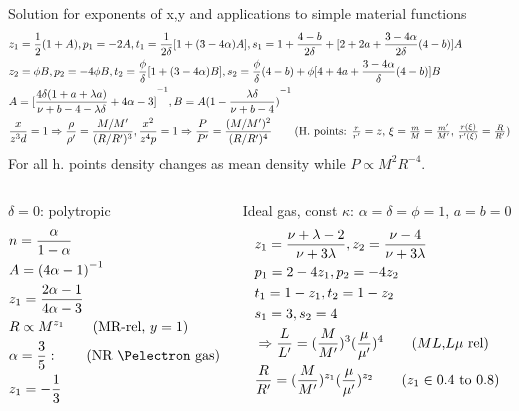 \begin{frame}{Solution for exponents of x,y and applications to simple material functions}
    \begin{align*}
            &z_1=\frac{1}{2}(1+A),p_1=-2A,t_1=\frac{1}{2\delta}[1+(3-4\alpha)A],s_1=1+\frac{4-b}{2\delta}+[2+2a+\frac{3-4\alpha}{2\delta}(4-b)]A\\
            &z_2=\phi B,p_2=-4\phi B,t_2=\frac{\phi}{\delta}[1+(3-4\alpha)B],s_2=\frac{\phi}{\delta}(4-b)+\phi[4+4a+\frac{3-4\alpha}{\delta}(4-b)]B\\
            &A=\invers{[\frac{4\delta(1+a+\lambda a)}{\nu+b-4-\lambda\delta}+4\alpha-3]},B=A\invers{(1-\frac{\lambda\delta}{\nu+b-4})}\\
            &\frac{x}{z^3d}=1\Rightarrow \frac{\rho}{\rho'}=\frac{M/M'}{(R/R')^3},\frac{x^2}{z^4p}=1\Rightarrow \frac{P}{P'}=\frac{(M/M')^2}{(R/R')^4}\tag{H. points: $\frac{r}{r'}=z$, $\xi=\frac{m}{M}=\frac{m'}{M'}$, $\frac{r(\xi)}{r'(\xi)}=\frac{R}{R'}$}
    \end{align*}
For all h. points density changes as mean density while $P\propto M^2R^{-4}$.
\begin{columns}[T]
    \begin{column}{0.3\textwidth}
        \begin{block}{$\delta=0$: polytropic}
            \begin{align*}
                &n=\frac{\alpha}{1-\alpha}\\
                &A=\invers{(4\alpha-1)}\\
                &z_1=\frac{2\alpha-1}{4\alpha-3}\\
                &R\propto M^{z_1}\tag{MR-rel, $y=1$}\\
                &\alpha=\frac{3}{5}:\tag{NR \Pelectron gas}\\
                &z_1=-\frac{1}{3}
            \end{align*}
        \end{block}
    \end{column}
    \begin{column}{0.38\textwidth}
        \begin{block}{Ideal gas, const $\kappa$: $\alpha=\delta=\phi=1$, $a=b=0$}
            \begin{align*}
                &z_1=\frac{\nu+\lambda-2}{\nu+3\lambda},z_2=\frac{\nu-4}{\nu+3\lambda}\\
                &p_1=2-4z_1,p_2=-4z_2\\
                &t_1=1-z_1,t_2=1-z_2\\
                &s_1=3,s_2=4\\
                &\Rightarrow \frac{L}{L'}=(\frac{M}{M'})^3(\frac{\mu}{\mu'})^4\tag{$ML$,$L\mu$ rel}\\
                &\frac{R}{R'}=(\frac{M}{M'})^{z_1}(\frac{\mu}{\mu'})^{z_2}\tag{$z_1\in\numrange{0.4}{0.8}$}
            \end{align*}


\end{block}
\end{column}
\end{columns}
\end{frame}
